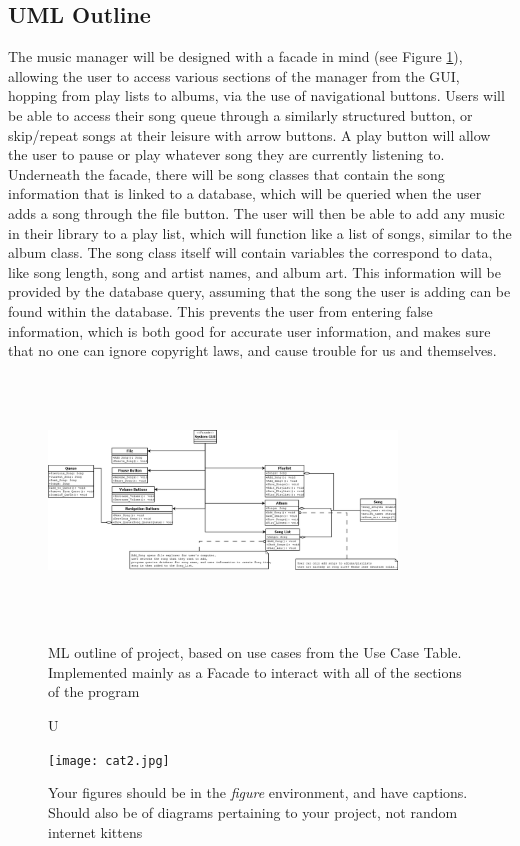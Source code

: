 \documentclass[10pt,conference,onecolumn,compsoc]{IEEEtran}
\begin{document}
\subsection{UML Outline}
The music manager will be designed with a facade in mind (see Figure \ref{UMLOutline}), allowing the user to access various sections of the manager from the GUI, hopping from play lists to albums, via the use of navigational buttons. Users will be able to access their song queue through a similarly structured button, or skip/repeat songs at their leisure with arrow buttons. A play button will allow the user to pause or play whatever song they are currently listening to. 
Underneath the facade, there will be song classes that contain the song information that is linked to a database, which will be queried when the user adds a song through the file button. The user will then be able to add any music in their library to a play list, which will function like a list of songs, similar to the album class.
The song class itself will contain variables the correspond to data, like song length, song and artist names, and album art. This information will be provided by the database query, assuming that the song the user is adding can be found within the database. This prevents the user from entering false information, which is both good for accurate user information, and makes sure that no one can ignore copyright laws, and cause trouble for us and themselves.

\begin{figure}
\includegraphics[height=250px, width=350px]{Music_Manager.png}
\caption UML outline of project, based on use cases from the Use Case Table. Implemented mainly as a Facade to interact with all of the sections of the program
\label{UMLOutline}
\end{figure}

\begin{figure}[ht!]
\texttt{[image: cat2.jpg]}
\caption{Your figures should be in the \emph{figure} environment, and have captions.  Should also be of diagrams pertaining to your project, not random internet kittens}
\label{cat2}
\end{figure}
\end{document}
